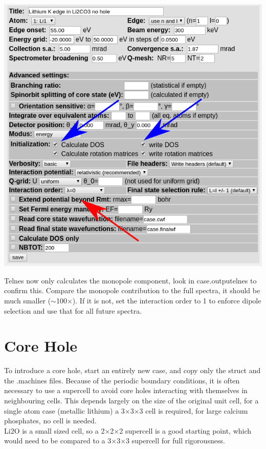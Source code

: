 \documentclass[12pt]{article}
\begin{document}
\includegraphics[scale=0.5]{./images/innes_monopole.png}

Telnes now only calculates the monopole component, look in case.outputelnes to confirm this.  Compare the monopole contribution to the full spectra, it should be much smaller ($\sim$100$\times$).  If it is not, set the interaction order to 1 to enforce dipole selection and use that for all future spectra.


\section{Core Hole}
To introduce a core hole, start an entirely new case, and copy only the struct and the .machines files.  Because of the periodic boundary conditions, it is often necessary to use a supercell to avoid core holes interacting with themselves in neighbouring cells. This depends largely on the size of the original unit cell, for a single atom case (metallic lithium) a 3$\times$3$\times$3 cell is required, for large calcium phosphates, no cell is needed. \\

Li2O is a small sized cell, so a 2$\times$2$\times$2 supercell is a good starting point, which would need to be compared to a 3$\times$3$\times$3 supercell for full rigorousness.  \\
\end{document}
